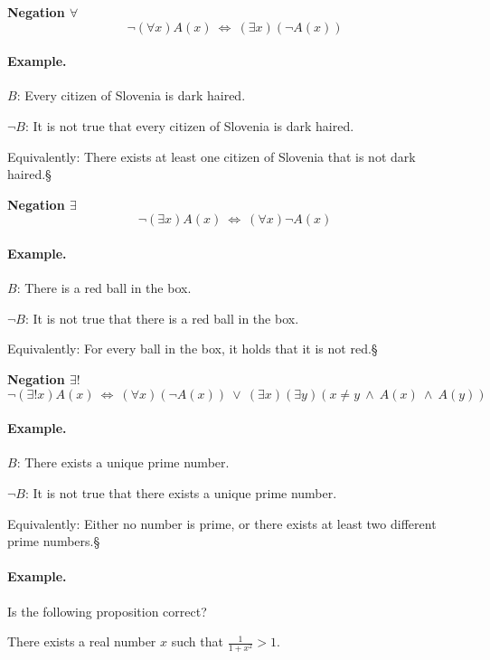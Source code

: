 \documentclass[11pt,paper=b5,footinclude,headinclude]{scrbook} %
\def\ali {{~\vee~}}
\def\inn {{~\wedge~}}
\def\cee {{~\Leftrightarrow~}}
\def\kz{{\hfill{\S}}}%
\theoremstyle{remark}
\theoremstyle{definition} %
\theoremstyle{theorem} %
\begin{document}
\textbf{ Negation $\forall$}
$$\neg (\forall x)A(x) \cee  (\exists x) (\neg A(x))$$

\medskip
\paragraph{Example.}

$B$: Every citizen of Slovenia is dark haired.

$\neg B$: It is not true that every citizen of Slovenia is dark haired.

Equivalently: There exists at least one citizen of Slovenia that is not dark haired.\kz

\medskip

\noindent\textbf{ Negation $\exists$}
$$\neg  (\exists x)A(x) \cee (\forall x) \neg A(x)$$

\medskip
\paragraph{Example.}

$B$: There is a red ball in the box.

$\neg B$: It is not true that there is a red ball in the box.

Equivalently: For every ball in the box, it holds that it is not red.\kz


\medskip

\noindent\textbf{ Negation $\exists !$}
$$\neg (\exists ! x)A(x) \cee  (\forall x) (\neg A(x)) \ali (\exists x)(\exists y)(x\neq y\inn A(x) \inn A(y))$$

\medskip
\paragraph{Example.}

$B$: There exists a unique prime number.

$\neg B$: It is not true that there exists a unique prime number.

Equivalently: Either no number is prime, or there exists at least two different prime numbers.\kz

\bigskip
\paragraph{Example.}

Is the following proposition correct?

There exists a real number $x$ such that $\frac{1}{1+x^2}>1$.
\end{document}
